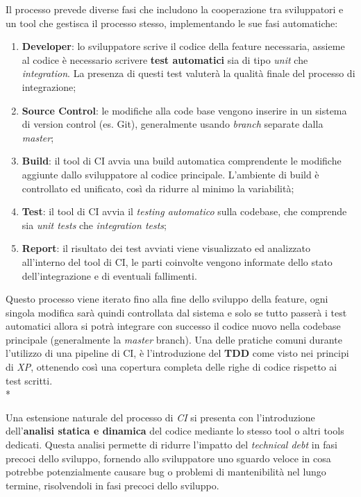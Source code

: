 \documentclass[../main.tex]{subfiles}
\begin{document}
        			Il processo prevede diverse fasi che includono la cooperazione tra sviluppatori e un tool che gestisca il processo stesso, implementando le sue fasi automatiche:
        			\begin{enumerate}
        			    \item \textbf{Developer}: lo sviluppatore scrive il codice della feature necessaria, assieme al codice è necessario scrivere \textbf{test automatici} sia di tipo \emph{unit} che \emph{integration}. La presenza di questi test valuterà la qualità finale del processo di integrazione;
        			    \item \textbf{Source Control}: le modifiche alla code base vengono inserire in un sistema di version control (es. Git), generalmente usando \emph{branch} separate dalla \emph{master};
        			    \item \textbf{Build}: il tool di CI avvia una build automatica comprendente le modifiche aggiunte dallo sviluppatore al codice principale. L'ambiente di build è controllato ed unificato, così da ridurre al minimo la variabilità;
        			    \item \textbf{Test}: il tool di CI avvia il \emph{testing automatico} sulla codebase, che comprende sia \emph{unit tests} che \emph{integration tests};
        			    \item \textbf{Report}: il risultato dei test avviati viene visualizzato ed analizzato all'interno del tool di CI, le parti coinvolte vengono informate dello stato dell'integrazione e di eventuali fallimenti.
        			\end{enumerate}
        			
        			Questo processo viene iterato fino alla fine dello sviluppo della feature, ogni singola modifica sarà quindi controllata dal sistema e solo se tutto passerà i test automatici allora si potrà integrare con successo il codice nuovo nella codebase principale (generalmente la \emph{master} branch). Una delle pratiche comuni durante l'utilizzo di una pipeline di CI, è l'introduzione del \textbf{TDD} come visto nei principi di \emph{XP}, ottenendo così una copertura completa delle righe di codice rispetto ai test scritti.\\*
        			
        			Una estensione naturale del processo di \emph{CI} si presenta con l'introduzione dell'\textbf{analisi statica e dinamica} del codice mediante lo stesso tool o altri tools dedicati. Questa analisi permette di ridurre l'impatto del \emph{technical debt} in fasi precoci dello sviluppo, fornendo allo sviluppatore uno sguardo veloce in cosa potrebbe potenzialmente causare bug o problemi di mantenibilità nel lungo termine, risolvendoli in fasi precoci dello sviluppo.
        		
\end{document}
